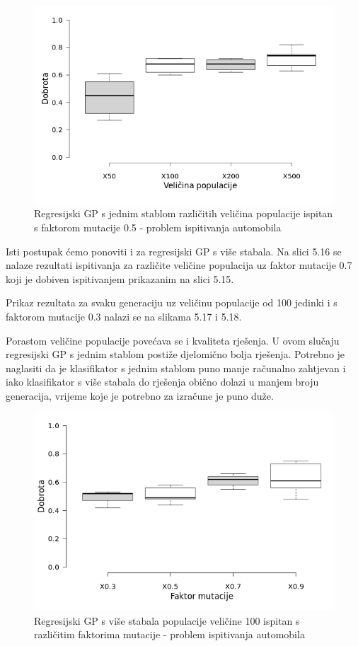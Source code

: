 \documentclass[times, utf8, zavrsni]{fer}
\begin{document}
\begin{figure}[htb]
\centering
\includegraphics[scale=0.5]{grafovi/boxplotCarS}
\caption{Regresijski GP s jednim stablom različitih veličina populacije ispitan s faktorom mutacije 0.5 - problem ispitivanja automobila}
\end{figure}




Isti postupak ćemo ponoviti i za regresijski GP s više stabala. Na slici 5.16 se nalaze rezultati ispitivanja za različite veličine populacija uz faktor mutacije 0.7 koji je dobiven ispitivanjem prikazanim na slici 5.15.

Prikaz rezultata za svaku generaciju uz veličinu populacije od 100 jedinki i s faktorom mutacije 0.3 nalazi se na slikama 5.17 i 5.18.



Porastom veličine populacije povećava se i kvaliteta rješenja. U ovom slučaju regresijski GP s jednim stablom postiže djelomično bolja rješenja. Potrebno je naglasiti da je klasifikator s jednim stablom puno manje računalno zahtjevan i iako klasifikator s više stabala do rješenja obično dolazi u manjem broju generacija, vrijeme koje je potrebno za izračune je puno duže.

\begin{figure}[htb]
\centering
\includegraphics[scale=0.5]{grafovi/boxplotCarMTest}
\caption{Regresijski GP s više stabala populacije veličine 100 ispitan s različitim faktorima mutacije - problem ispitivanja automobila}
\end{figure}
\end{document}
